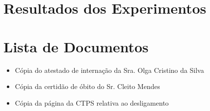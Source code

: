 \documentclass[12pt]{article}
\begin{document}
\newpage




\newpage

\appendix
\section{Resultados dos Experimentos}





\newpage

\section{Lista de Documentos}

\begin{itemize}
	\item Cópia do atestado de internação da Sra. Olga Cristino da Silva
	\item Cópia da certidão de óbito do Sr. Cleito Mendes
	\item Cópia da página da CTPS relativa ao desligamento
\end{itemize}
\end{document}

